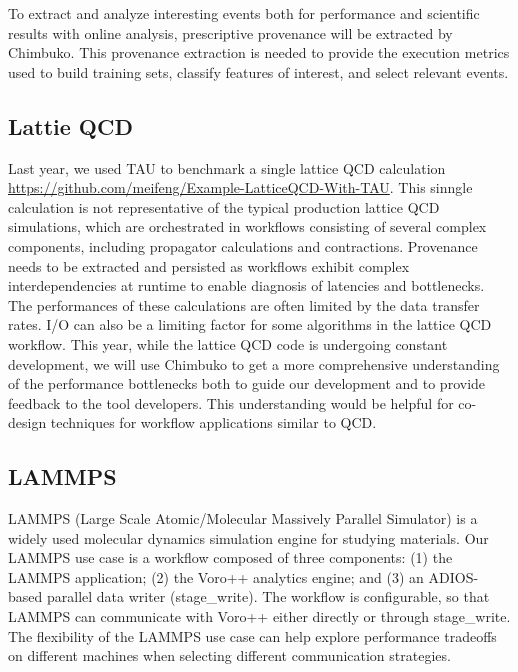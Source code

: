 To extract and analyze interesting events both for performance and scientific results with online analysis, prescriptive provenance will be extracted by Chimbuko.  This provenance extraction is needed to provide the execution metrics used to build training sets, classify features of interest, and select relevant events. 

\subsection{Lattie QCD}
Last year, we used TAU to benchmark a single lattice QCD calculation \url{https://github.com/meifeng/Example-LatticeQCD-With-TAU}.   This sinngle calculation is not representative of the typical production lattice QCD simulations, which are orchestrated in workflows consisting of several complex components, including propagator calculations and contractions. Provenance needs to be extracted and persisted as workflows exhibit complex interdependencies at runtime to enable diagnosis of latencies and bottlenecks. The performances of these calculations are often limited by the data transfer rates. I/O can also be a limiting factor for some algorithms in the lattice QCD workflow. This year, while the lattice QCD code is undergoing constant development, we will use Chimbuko to get a more comprehensive understanding of the performance bottlenecks both to guide our development and to provide feedback to the tool developers. This understanding would be helpful for co-design techniques for workflow applications similar to QCD.

\subsection {LAMMPS}
LAMMPS (Large Scale Atomic/Molecular Massively Parallel Simulator) is a widely used molecular dynamics simulation engine for studying materials. Our LAMMPS use case is a workflow composed of three components: (1) the LAMMPS application; (2) the Voro++ analytics engine; and (3) an ADIOS-based parallel data writer (stage\_write). The workflow is configurable, so that LAMMPS can communicate with Voro++ either directly or through stage\_write. The flexibility of the LAMMPS use case can help explore performance tradeoffs on different machines when selecting different communication strategies.

